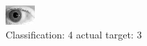 \begin{figure}[h!]
\begin{center}
\includegraphics[width=0.60\columnwidth]{figures/ID284_class_4_target_3.png}
\end{center}
\caption{ Classification: 4 actual target: 3}
\label{fig:ID284_class_4_target_3}
\end{figure}
